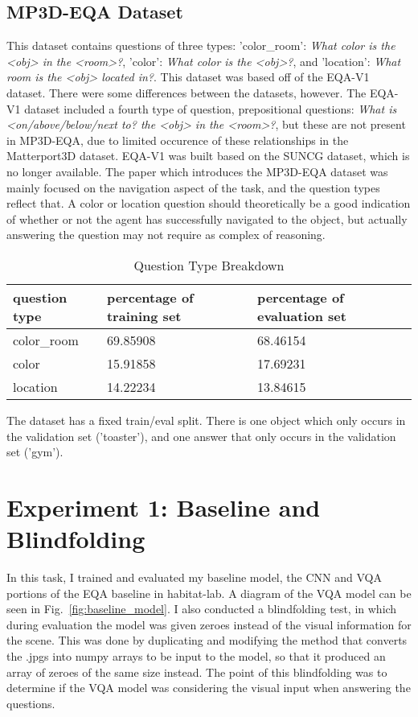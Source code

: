 \subsection{MP3D-EQA Dataset} 
This dataset contains questions of three types: 'color\_room': \emph{What color is the <obj> in the <room>?}, 'color': \emph{What color is the <obj>?}, and 'location': \emph{What room is the <obj> located in?}. This dataset was based off of the EQA-V1 dataset\cite{embodiedqa}. There were some differences between the datasets, however. The EQA-V1 dataset included a fourth type of question, prepositional questions: \emph{What is <on/above/below/next to? the <obj> in the <room>?}, but these are not present in MP3D-EQA, due to limited occurence of these relationships in the Matterport3D dataset. EQA-V1 was built based on the SUNCG dataset, which is no longer available. 
The paper which introduces the MP3D-EQA dataset was mainly focused on the navigation aspect of the task, and the question types reflect that. A color or location question should theoretically be a good indication of whether or not the agent has successfully navigated to the object, but actually answering the question may not require as complex of reasoning. 

\begin{table}[h]
\centering
\caption{Question Type Breakdown}
\begin{tabular}{ |l|l|l| }
\hline
\textbf{question type} & \textbf{percentage of training set} & \textbf{percentage of evaluation set} \\
\hline
color\_room & 69.85908 & 68.46154\\
color & 15.91858 & 17.69231\\
location & 14.22234 & 13.84615\\
\hline
\end{tabular}
\label{tab:q_breakdown}
\end{table}

The dataset has a fixed train/eval split. There is one object which only occurs in the validation set ('toaster'), and one answer that only occurs in the validation set ('gym'). 

\section{Experiment 1: Baseline and Blindfolding}
\label{sec:exp_1}
In this task, I trained and evaluated my baseline model, the CNN and VQA portions of the EQA baseline in habitat-lab. A diagram of the VQA model can be seen in Fig.~\ref{fig:baseline_model}. I also conducted a blindfolding test, in which during evaluation the model was given zeroes instead of the visual information for the scene. This was done by duplicating and modifying the method that converts the .jpgs into numpy arrays to be input to the model, so that it produced an array of zeroes of the same size instead. The point of this blindfolding was to determine if the VQA model was considering the visual input when answering the questions. 

